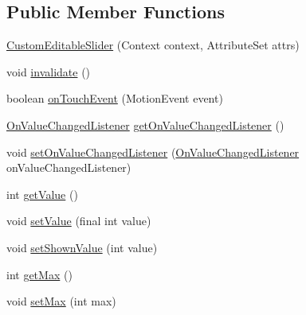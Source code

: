 \subsection*{Public Member Functions}
\begin{DoxyCompactItemize}
\item 
\hyperlink{classandroid_1_1app_1_1printerapp_1_1util_1_1ui_1_1_custom_editable_slider_a96acbf099b359addc69ccb6d746bf809}{Custom\+Editable\+Slider} (Context context, Attribute\+Set attrs)
\item 
void \hyperlink{classandroid_1_1app_1_1printerapp_1_1util_1_1ui_1_1_custom_editable_slider_a2906c28cbc0a2c7e1e68f8796a8625f7}{invalidate} ()
\item 
boolean \hyperlink{classandroid_1_1app_1_1printerapp_1_1util_1_1ui_1_1_custom_editable_slider_ab2ad369a54b8388fbabcdf5d310ee628}{on\+Touch\+Event} (Motion\+Event event)
\item 
\hyperlink{interfaceandroid_1_1app_1_1printerapp_1_1util_1_1ui_1_1_custom_editable_slider_1_1_on_value_changed_listener}{On\+Value\+Changed\+Listener} \hyperlink{classandroid_1_1app_1_1printerapp_1_1util_1_1ui_1_1_custom_editable_slider_abf6d74bf4e9379828a30fa923b8127aa}{get\+On\+Value\+Changed\+Listener} ()
\item 
void \hyperlink{classandroid_1_1app_1_1printerapp_1_1util_1_1ui_1_1_custom_editable_slider_a94c54bf92bf92c19121deb2bcc728eda}{set\+On\+Value\+Changed\+Listener} (\hyperlink{interfaceandroid_1_1app_1_1printerapp_1_1util_1_1ui_1_1_custom_editable_slider_1_1_on_value_changed_listener}{On\+Value\+Changed\+Listener} on\+Value\+Changed\+Listener)
\item 
int \hyperlink{classandroid_1_1app_1_1printerapp_1_1util_1_1ui_1_1_custom_editable_slider_a8e1a9a6ac0af06651439d687f0678b1b}{get\+Value} ()
\item 
void \hyperlink{classandroid_1_1app_1_1printerapp_1_1util_1_1ui_1_1_custom_editable_slider_a86fd2f4a07275ea859519b20fa58e3bc}{set\+Value} (final int value)
\item 
void \hyperlink{classandroid_1_1app_1_1printerapp_1_1util_1_1ui_1_1_custom_editable_slider_a414f10c0750d5b70aa65ebec62782032}{set\+Shown\+Value} (int value)
\item 
int \hyperlink{classandroid_1_1app_1_1printerapp_1_1util_1_1ui_1_1_custom_editable_slider_a39f429098a7c8828ecb7e1c64a935ef3}{get\+Max} ()
\item 
void \hyperlink{classandroid_1_1app_1_1printerapp_1_1util_1_1ui_1_1_custom_editable_slider_a79df9f21d03b994bef8a10f9627c85cb}{set\+Max} (int max)

\end{DoxyCompactItemize}

